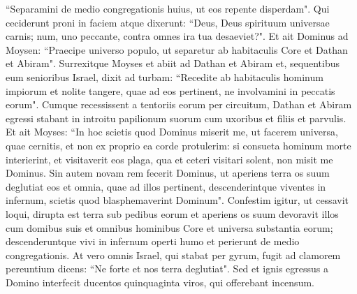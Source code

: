 \begin{biblechapter}
\verse “Separamini de medio congregationis huius, ut eos repente disperdam". 
\verse Qui ceciderunt proni in faciem atque dixerunt: “Deus, Deus spirituum universae carnis; num, uno peccante, contra omnes ira tua desaeviet?". 
\verse Et ait Dominus ad Moysen:  
\verse “Praecipe universo populo, ut separetur ab habitaculis Core et Dathan et Abiram". 
\verse Surrexitque Moyses et abiit ad Dathan et Abiram et, sequentibus eum senioribus Israel, 
\verse dixit ad turbam: “Recedite ab habitaculis hominum impiorum et nolite tangere, quae ad eos pertinent, ne involvamini in peccatis eorum". 
\verse Cumque recessissent a tentoriis eorum per circuitum, Dathan et Abiram egressi stabant in introitu papilionum suorum cum uxoribus et filiis et parvulis. 
\verse Et ait Moyses: “In hoc scietis quod Dominus miserit me, ut facerem universa, quae cernitis, et non ex proprio ea corde protulerim: 
\verse si consueta hominum morte interierint, et visitaverit eos plaga, qua et ceteri visitari solent, non misit me Dominus. 
\verse Sin autem novam rem fecerit Dominus, ut aperiens terra os suum deglutiat eos et omnia, quae ad illos pertinent, descenderintque viventes in infernum, scietis quod blasphemaverint Dominum". 
\verse Confestim igitur, ut cessavit loqui, dirupta est terra sub pedibus eorum  
\verse et aperiens os suum devoravit illos cum domibus suis et omnibus hominibus Core et universa substantia eorum; 
\verse descenderuntque vivi in infernum operti humo et perierunt de medio congregationis. 
\verse At vero omnis Israel, qui stabat per gyrum, fugit ad clamorem pereuntium dicens: “Ne forte et nos terra deglutiat". 
\verse Sed et ignis egressus a Domino interfecit ducentos quinquaginta viros, qui offerebant incensum. 
\end{biblechapter}

